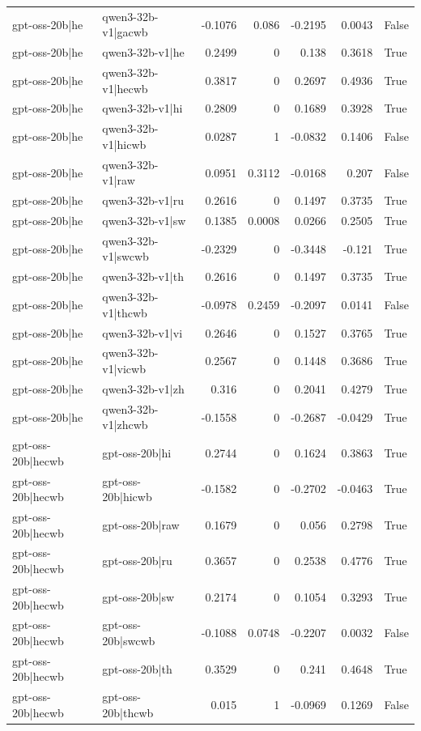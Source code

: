 \begin{table}
\begin{tabular}{l l r r r r l}
gpt-oss-20b|he & qwen3-32b-v1|gacwb & -0.1076 & 0.086 & -0.2195 & 0.0043 & False \\
gpt-oss-20b|he & qwen3-32b-v1|he & 0.2499 & 0 & 0.138 & 0.3618 & True \\
gpt-oss-20b|he & qwen3-32b-v1|hecwb & 0.3817 & 0 & 0.2697 & 0.4936 & True \\
gpt-oss-20b|he & qwen3-32b-v1|hi & 0.2809 & 0 & 0.1689 & 0.3928 & True \\
gpt-oss-20b|he & qwen3-32b-v1|hicwb & 0.0287 & 1 & -0.0832 & 0.1406 & False \\
gpt-oss-20b|he & qwen3-32b-v1|raw & 0.0951 & 0.3112 & -0.0168 & 0.207 & False \\
gpt-oss-20b|he & qwen3-32b-v1|ru & 0.2616 & 0 & 0.1497 & 0.3735 & True \\
gpt-oss-20b|he & qwen3-32b-v1|sw & 0.1385 & 0.0008 & 0.0266 & 0.2505 & True \\
gpt-oss-20b|he & qwen3-32b-v1|swcwb & -0.2329 & 0 & -0.3448 & -0.121 & True \\
gpt-oss-20b|he & qwen3-32b-v1|th & 0.2616 & 0 & 0.1497 & 0.3735 & True \\
gpt-oss-20b|he & qwen3-32b-v1|thcwb & -0.0978 & 0.2459 & -0.2097 & 0.0141 & False \\
gpt-oss-20b|he & qwen3-32b-v1|vi & 0.2646 & 0 & 0.1527 & 0.3765 & True \\
gpt-oss-20b|he & qwen3-32b-v1|vicwb & 0.2567 & 0 & 0.1448 & 0.3686 & True \\
gpt-oss-20b|he & qwen3-32b-v1|zh & 0.316 & 0 & 0.2041 & 0.4279 & True \\
gpt-oss-20b|he & qwen3-32b-v1|zhcwb & -0.1558 & 0 & -0.2687 & -0.0429 & True \\
gpt-oss-20b|hecwb & gpt-oss-20b|hi & 0.2744 & 0 & 0.1624 & 0.3863 & True \\
gpt-oss-20b|hecwb & gpt-oss-20b|hicwb & -0.1582 & 0 & -0.2702 & -0.0463 & True \\
gpt-oss-20b|hecwb & gpt-oss-20b|raw & 0.1679 & 0 & 0.056 & 0.2798 & True \\
gpt-oss-20b|hecwb & gpt-oss-20b|ru & 0.3657 & 0 & 0.2538 & 0.4776 & True \\
gpt-oss-20b|hecwb & gpt-oss-20b|sw & 0.2174 & 0 & 0.1054 & 0.3293 & True \\
gpt-oss-20b|hecwb & gpt-oss-20b|swcwb & -0.1088 & 0.0748 & -0.2207 & 0.0032 & False \\
gpt-oss-20b|hecwb & gpt-oss-20b|th & 0.3529 & 0 & 0.241 & 0.4648 & True \\
gpt-oss-20b|hecwb & gpt-oss-20b|thcwb & 0.015 & 1 & -0.0969 & 0.1269 & False \\

\end{tabular}
\end{table}
